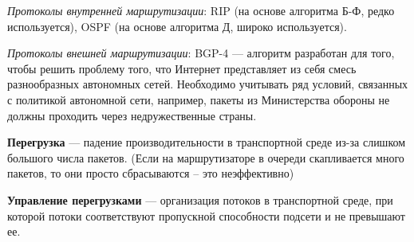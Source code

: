 \textit{Протоколы внутренней маршрутизации}: RIP (на основе алгоритма Б-Ф, редко используется), OSPF (на основе алгоритма Д, широко используется).

\textit{Протоколы внешней маршрутизации}: BGP-4 --- алгоритм разработан для того, чтобы решить проблему того, что Интернет представляет из себя смесь разнообразных автономных сетей. Необходимо учитывать ряд условий, связанных с политикой автономной сети, например, пакеты из Министерства обороны не должны проходить через недружественные страны.


\textbf{Перегрузка} --- падение производительности в транспортной среде из-за слишком большого числа пакетов. (Если на маршрутизаторе в очереди скапливается много пакетов, то они просто сбрасываются -- это неэффективно)

\textbf{Управление перегрузками} --- организация потоков в транспортной среде, при которой потоки соответствуют пропускной способности подсети и не превышают ее.


